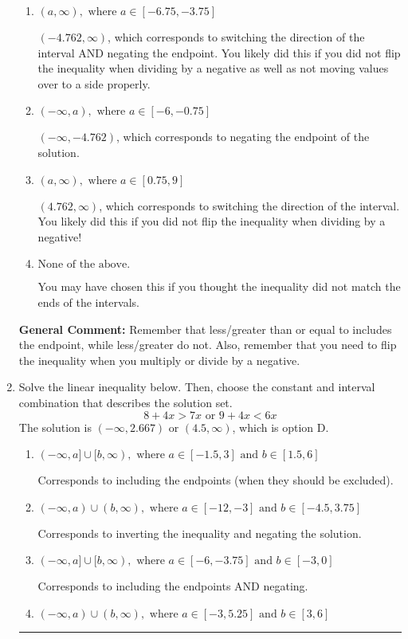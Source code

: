 \documentclass{extbook}[14pt]
\newcommand{\litem}[1]{\item #1

\rule{\textwidth}{0.4pt}}
\begin{document}
\begin{enumerate}
{\begin{enumerate}[label=\Alph*.]
* $(-\infty, 4.762)$, which is the correct option.
\item \( (a, \infty), \text{ where } a \in [-6.75, -3.75] \)

 $(-4.762, \infty)$, which corresponds to switching the direction of the interval AND negating the endpoint. You likely did this if you did not flip the inequality when dividing by a negative as well as not moving values over to a side properly.
\item \( (-\infty, a), \text{ where } a \in [-6, -0.75] \)

 $(-\infty, -4.762)$, which corresponds to negating the endpoint of the solution.
\item \( (a, \infty), \text{ where } a \in [0.75, 9] \)

 $(4.762, \infty)$, which corresponds to switching the direction of the interval. You likely did this if you did not flip the inequality when dividing by a negative!
\item \( \text{None of the above}. \)

You may have chosen this if you thought the inequality did not match the ends of the intervals.
\end{enumerate}

\textbf{General Comment:} Remember that less/greater than or equal to includes the endpoint, while less/greater do not. Also, remember that you need to flip the inequality when you multiply or divide by a negative.
}
\litem{
Solve the linear inequality below. Then, choose the constant and interval combination that describes the solution set.
\[ 8 + 4 x > 7 x \text{ or } 9 + 4 x < 6 x \]The solution is \( (-\infty, 2.667) \text{ or } (4.5, \infty) \), which is option D.\begin{enumerate}[label=\Alph*.]
\item \( (-\infty, a] \cup [b, \infty), \text{ where } a \in [-1.5, 3] \text{ and } b \in [1.5, 6] \)

Corresponds to including the endpoints (when they should be excluded).
\item \( (-\infty, a) \cup (b, \infty), \text{ where } a \in [-12, -3] \text{ and } b \in [-4.5, 3.75] \)

Corresponds to inverting the inequality and negating the solution.
\item \( (-\infty, a] \cup [b, \infty), \text{ where } a \in [-6, -3.75] \text{ and } b \in [-3, 0] \)

Corresponds to including the endpoints AND negating.
\item \( (-\infty, a) \cup (b, \infty), \text{ where } a \in [-3, 5.25] \text{ and } b \in [3, 6] \)


\end{enumerate}}
\end{enumerate}
\end{document}
